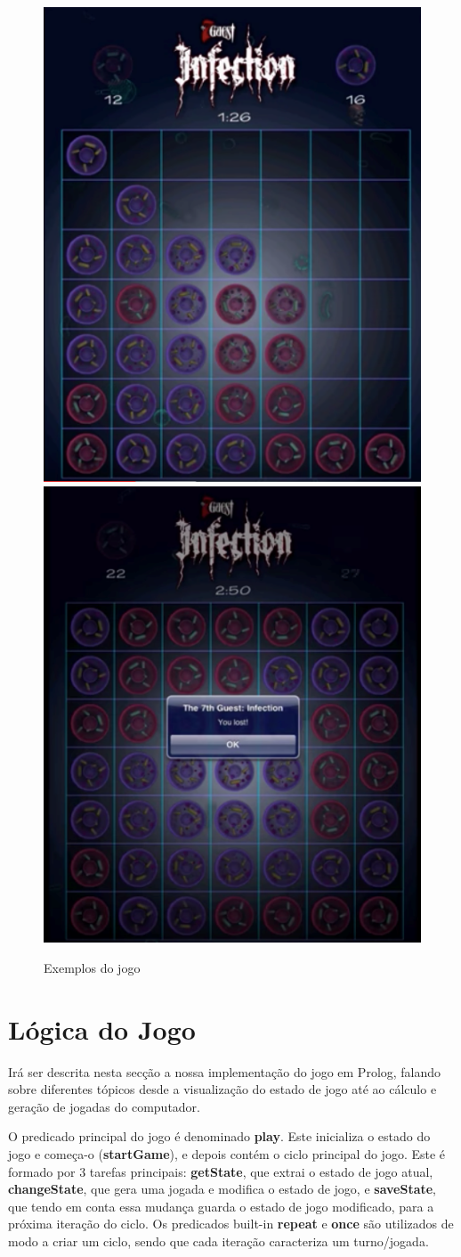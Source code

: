 \documentclass[a4paper]{article}
\begin{document}
\bigskip
\begin{figure}[hbp!]
    \centering
    \includegraphics[width=.4\linewidth]{others/game-2.png}
    \includegraphics[width=.416\linewidth]{others/game-3.png}
    \caption{Exemplos do jogo}
    \label{fig}
\end{figure}

\newpage\section{Lógica do Jogo}

Irá ser descrita nesta secção a nossa implementação do jogo em Prolog, falando sobre diferentes tópicos desde a visualização do estado de jogo até ao cálculo e geração de jogadas do computador.

\bigskip
O predicado principal do jogo é denominado \textbf{play}. Este inicializa o estado do jogo e começa-o (\textbf{startGame}), e depois contém o ciclo principal do jogo. Este é formado por 3 tarefas principais: \textbf{getState}, que extrai o estado de jogo atual, \textbf{changeState}, que gera uma jogada e modifica o estado de jogo, e \textbf{saveState}, que tendo em conta essa mudança guarda o estado de jogo modificado, para a próxima iteração do ciclo. Os predicados built-in \textbf{repeat} e \textbf{once} são utilizados de modo a criar um ciclo, sendo que cada iteração caracteriza um turno/jogada. 
\end{document}
